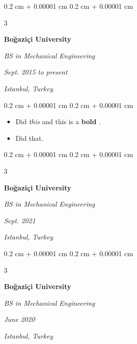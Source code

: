 \documentclass[10pt, letterpaper]{article}
\newenvironment{highlights}{
    \begin{itemize}[
        topsep=0.10 cm,
        parsep=0.10 cm,
        partopsep=0pt,
        itemsep=0pt,
        leftmargin=0.4 cm + 10pt + 0.6 cm
    ]
}{
    \end{itemize}
} %
\newenvironment{onecolentry}{
    \begin{adjustwidth}{
        0.2 cm + 0.00001 cm
    }{
        0.2 cm + 0.00001 cm
    }
}{
    \end{adjustwidth}
} %
\newenvironment{threecolentry}[3][]{
    \onecolentry
    \def\thirdColumn{#3}
    \setcolumnwidth{0.6 cm, \fill, 4.5 cm}
    \begin{paracol}{3}
    #2 \switchcolumn
}{
    \switchcolumn \raggedleft \thirdColumn
    \end{paracol}
    \endonecolentry
} %
\let\hrefWithoutArrow\href
\renewcommand{\href}[2]{\hrefWithoutArrow{#1}{\mbox{\ifthenelse{\equal{#2}{}}{ }{#2 }\raisebox{.15ex}{\footnotesize \faExternalLink*}}}}
\begin{document}
        \vspace{0.2 cm}

        \begin{threecolentry}{
            \vspace*{\fill}
            \textbullet
            \vspace*{3px}
            \vspace*{\fill}
        }{
        \textit{Sept. 2015 to present}
            
        \textit{Istanbul, Turkey}}
            \textbf{Boğaziçi University}

            \textit{BS in Mechanical Engineering}
        \end{threecolentry}

        \vspace{0.10 cm}
        \begin{onecolentry}
            \begin{highlights}
                \item Did \textit{this} and this is a \textbf{bold} \href{https://example.com}{link}.
                \item Did that.
            \end{highlights}
        \end{onecolentry}


        \vspace{0.2 cm}

        \begin{threecolentry}{
            \vspace*{\fill}
            \textbullet
            \vspace*{3px}
            \vspace*{\fill}
        }{
        \textit{Sept. 2021}
            
        \textit{Istanbul, Turkey}}
            \textbf{Boğaziçi University}

            \textit{BS in Mechanical Engineering}
        \end{threecolentry}



        \vspace{0.2 cm}

        \begin{threecolentry}{
            \vspace*{\fill}
            \textbullet
            \vspace*{3px}
            \vspace*{\fill}
        }{
        \textit{June 2020}
            
        \textit{Istanbul, Turkey}}
            \textbf{Boğaziçi University}

            \textit{BS in Mechanical Engineering}
        \end{threecolentry}
\end{document}
